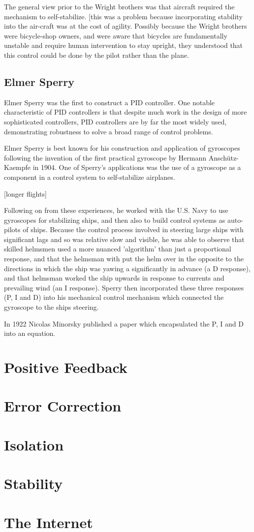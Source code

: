 
The general view prior to the Wright brothers was that aircraft required the mechanism to
self-stabilize. [this was a problem because incorporating stability into the air-craft was at the
cost of agility. Possibly because the Wright brothers were bicycle-shop owners, and were aware that
bicycles are fundamentally unstable and require human intervention to stay upright, they understood
that this control could be done by the pilot rather than the plane.

\subsection{Elmer Sperry}

Elmer Sperry was the first to construct a PID controller. One notable characteristic of PID
controllers is that despite much work in the design of more sophisticated controllers, PID
controllers are by far the most widely used, demonstrating robustness to solve a broad range of
control problems.

Elmer Sperry is best known for his construction and application of gyroscopes following the
invention of the first practical gyroscope by Hermann Anschütz-Kaempfe in 1904. One of Sperry's
applications was the use of a gyroscope as a component in a control system to self-stabilize
airplanes.

[longer flights]
 
Following on from these experiences, he worked with the U.S. Navy to use gyroscopes for stabilizing
ships, and then also to build control systems as auto-pilots of ships. Because the control process
involved in steering large ships with significant lags and so was relative slow and visible, he was
able to observe that skilled helmsmen used a more nuanced 'algorithm' than just a proportional
response, and that the helmsman with put the helm over in the opposite to the directions in which
the ship was yawing a significantly in advance (a D response), and that helmsman worked the ship
upwards in response to currents and prevailing wind (an I response). Sperry then incorporated these
three responses (P, I and D) into his mechanical control mechanism which connected the gyroscope to
the ships steering.

In 1922 Nicolas Minorsky published a paper which encapsulated the P, I and D into an
equation.\cite{minorsky1922}

\section{Positive Feedback}

\section{Error Correction}

\section{Isolation}

\section{Stability}

\section{The Internet}


